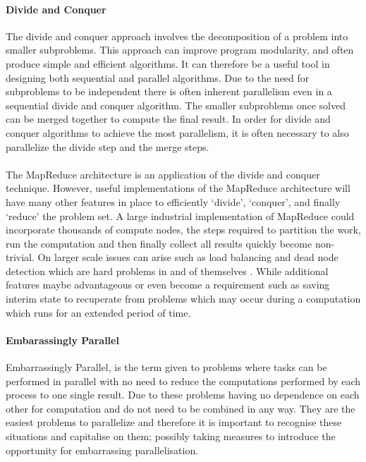 \documentclass[main.tex]{subfiles}
\begin{document}
{{%
\paragraph{Divide and Conquer} The divide and conquer approach involves the decomposition of a problem into smaller subproblems. This approach can improve program modularity, and often produce simple and efficient algorithms. It can therefore be a useful tool in designing both sequential and parallel algorithms. Due to the need for subproblems to be independent there is often inherent parallelism even in a sequential divide and conquer algorithm. The smaller subproblems once solved can be merged together to compute the final result. In order for divide and conquer algorithms to achieve the most parallelism, it is often necessary to also parallelize the divide step and the merge steps.

\paragraph{}The MapReduce architecture is an application of the divide and conquer technique. However, useful implementations of the MapReduce architecture will have many other features in place to efficiently `divide', `conquer', and finally `reduce' the problem set. A large industrial implementation of MapReduce could incorporate thousands of compute nodes, the steps required to partition the work, run the computation and then finally collect all results quickly become non-trivial. On larger scale issues can arise such as load balancing and dead node detection which are hard problems in and of themselves \cite{Dean2004}. While additional features maybe advantageous or even become a requirement such as saving interim state to recuperate from problems which may occur during a computation which runs for an extended period of time.

\paragraph{Embarassingly Parallel} Embarrassingly Parallel, is the term given to problems where tasks can be performed in parallel with no need to reduce the computations performed by each process to one single result. Due to these problems having no dependence on each other for computation and do not need to be combined in any way. They are the easiest problems to parallelize and therefore it is important to recognise these situations and capitalise on them; possibly taking measures to introduce the opportunity for embarrassing parallelisation.

}}
\end{document}
